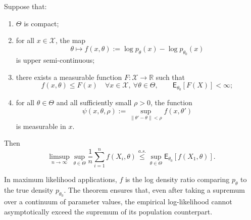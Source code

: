 \begin{theo}
\label{theo:one-sided-ulln}
Suppose that:
\begin{enumerate}[label=\alph*)]
	\item $\Theta$ is compact;
	\item for all $x \in \mathcal{X}$, the map
	\begin{equation*}
	\theta \mapsto f(x,\theta) := \log p_{\theta}(x) - \log p_{\theta_0}(x)
	\end{equation*}
	is upper semi-continuous;
	\item there exists a measurable function $F:\mathcal{X}\to\mathbb{R}$ such that
	\begin{equation*}
	f(x,\theta) \le F(x)
	\quad \forall x\in\mathcal{X},\ \forall \theta\in\Theta,
	\qquad
	\mathsf{E}_{\theta_0}[F(X)] < \infty;
	\end{equation*}
	\item for all $\theta \in \Theta$ and all sufficiently small $\rho>0$, the function
	\begin{equation*}
	\psi(x,\theta,\rho)
	:=
	\sup_{\|\theta'-\theta\|<\rho} f(x,\theta')
	\end{equation*}
	is measurable in $x$.
\end{enumerate}
Then
\begin{equation*}
\limsup_{n\to\infty}
\sup_{\theta\in\Theta}
\frac{1}{n}\sum_{i=1}^n f(X_i,\theta)
\stackrel{a.s.}{\le}
\sup_{\theta\in\Theta}
\mathsf{E}_{\theta_0}[f(X_1,\theta)].
\end{equation*}
\end{theo}

\begin{remark}
In maximum likelihood applications, $f$ is the log density ratio comparing $p_\theta$ to the true density $p_{\theta_0}$. The theorem ensures that, even after taking a supremum over a continuum of parameter values, the empirical log-likelihood cannot asymptotically exceed the supremum of its population counterpart.
\end{remark}

